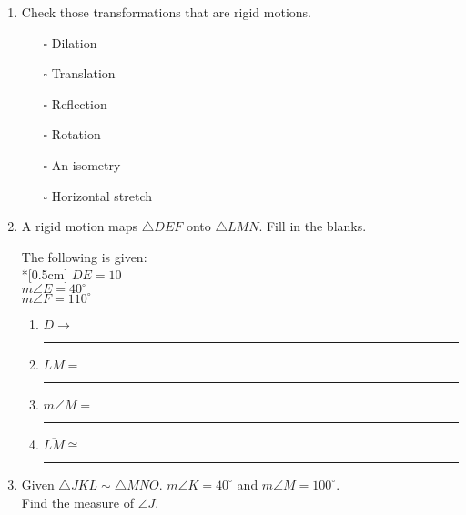 \documentclass[12pt, twoside]{article}
\begin{document}
\begin{enumerate}
\item Check those transformations that are rigid motions.
    \begin{itemize}
      \item[$\square$] Dilation
      \item[$\square$] Translation
      \item[$\square$] Reflection
      \item[$\square$] Rotation
      \item[$\square$] An isometry
      \item[$\square$] Horizontal stretch
    \end{itemize}

\item A rigid motion maps $\triangle DEF$ onto $\triangle LMN$. Fill in the blanks. \vspace{0.5cm}
  \begin{multicols}{2}
    The following is given:\\*[0.5cm]
    $DE=10$ \\
    $m\angle E = 40^\circ$ \\
    $m\angle F = 110^\circ$ \\[0.5cm]
    \columnbreak
    \begin{enumerate}
      \item $D \rightarrow$ \rule{2cm}{0.15mm}
      \item $LM =$ \rule{2cm}{0.15mm}
      \item $m\angle M =$ \rule{2cm}{0.15mm}
      \item $\overline{LM} \cong$ \rule{2cm}{0.15mm}
    \end{enumerate}
  \end{multicols} 

\item Given $\triangle JKL \sim \triangle MNO$. $m\angle K = 40^\circ$ and $m\angle M = 100^\circ$.\\
    Find the measure of $\angle J$. \vspace{3cm}

\end{enumerate}
\end{document}
